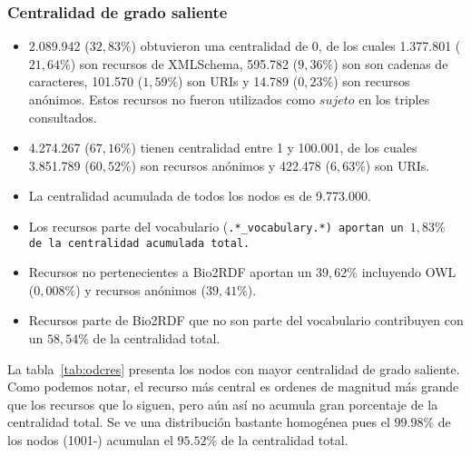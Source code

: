 \subsubsection{Centralidad de grado saliente}
\begin{itemize}
  \item 2.089.942 ($32,83\%$) obtuvieron una centralidad de 0, de los cuales
      1.377.801 ($21,64\%$) son recursos de XMLSchema,
      595.782 ($9,36\%$) son son cadenas de caracteres,
      101.570 ($1,59\%$) son URIs y
      14.789 ($0,23\%$) son recursos anónimos.
      Estos recursos no fueron utilizados como $sujeto$ en los triples
      consultados.
  \item
    4.274.267 ($67,16\%$) tienen centralidad entre 1 y 100.001, de los cuales
      3.851.789 ($60,52\%$) son recursos anónimos y
      422.478 ($6,63\%$) son URIs.
  \item La centralidad acumulada de todos los nodos es de 9.773.000.
  \item 
    Los recursos parte del vocabulario (\tt{.*\_vocabulary.*}) aportan un 
    $1,83\%$ de la centralidad acumulada total.
  \item
    Recursos no pertenecientes a Bio2RDF aportan un $39,62\%$ incluyendo OWL 
    ($0,008\%$) y recursos anónimos ($39,41\%$).
  \item 
    Recursos parte de Bio2RDF que no son parte del vocabulario contribuyen con
    un $58,54\%$ de la centralidad total.
\end{itemize}

La tabla~\ref{tab:odcres} presenta los nodos con mayor centralidad de grado
saliente.
Como podemos notar, el recurso más central es ordenes de magnitud más grande
que los recursos que lo siguen, pero aún así no acumula gran porcentaje de la
centralidad total.
Se ve una distribución bastante homogénea pues el $99.98\%$ de los nodos (1001-)
acumulan el $95.52\%$ de la centralidad total.

